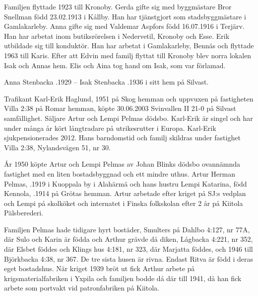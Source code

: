 Familjen flyttade 1923 till Kronoby.
Gerda gifte sig med byggmästare Bror Snellman född 23.02.1913 i Kållby. Han har tjänstgjort som stadsbyggmästare i Gamlakarleby. Anna gifte sig med Valdemar Aspfors född 16.07.1916 i Terjärv. Han har arbetat inom butiksrörelsen i Nedervetil, Kronoby och Esse. Erik utbildade sig till konduktör. Han har arbetat i Gamlakarleby, Bennäs och flyttade 1963 till Karis. Efter att Edvin med familj flyttat till Kronoby blev norra lokalen Isak och Annas hem. Elis och Aina tog hand om Isak, som var förlamad.

Anna Stenbacka .1929  --  Isak Stenbacka .1936 i sitt hem på Silvast.




Trafikant Karl-Erik Haglund,  1951 på Skog hemman och uppvuxen på fastigheten Villa 2:38 på Romar hemman, köpte 30.06.2003 Svinvallen II 21-0 på Silvast samfällighet. Säljare Artur och Lempi Pelmas dödsbo. Karl-Erik är singel och har under många år kört långtradare på utrikesrutter i Europa. Karl-Erik sjukpensionerades 2012. Hans barndomstid och familj skildras under fastighet Villa 2:38, Nylandsvägen 51, nr 30.


År 1950 köpte Artur och Lempi Pelmas av Johan Blinks dödsbo ovannämnda fastighet med en liten bostadsbyggnad och ett mindre uthus. Artur Herman Pelmas, .1919 i Kuoppala by i Alahärmä och hans hustru Lempi Katarina, född Kennola, .1914 på Grötas hemman. Artur arbetade efter kriget på SJ:s vedplan och Lempi på skolköket och internatet i Finska folkskolan efter 2 år på Kiitola 	Pälsberederi.
\begin{jhchildren}
  \item {}
  \item {}
  \item {}
  \item {}
  \item {}
\end{jhchildren}
Familjen Pelmas hade tidigare hyrt bostäder, Smulters på Dahlbo 4:127, nr 77A, där Sulo och Karin är födda och Arthur grävde då diken, Lågbacka 4:221, nr 352, där Elsbet föddes och Klings hus 4:181, nr 323, där Marjatta föddes, och 1946 till Björkbacka 4:38, nr 367. De tre sista husen är rivna. Endast Ritva är född i deras eget bostadshus. När kriget 1939 bröt ut fick Arthur arbete på krigsmaterialfabriken i Yxpila och familjen bodde då där till 1941, då han fick arbete som portvakt vid patronfabriken på Kiitola.

